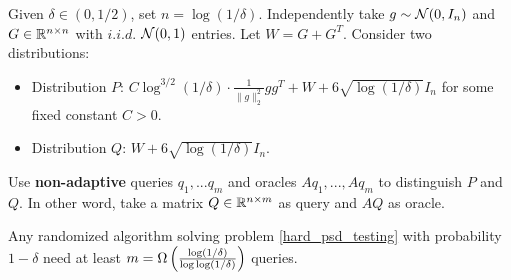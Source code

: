 \begin{prob}
    \label{hard_psd_testing}
    Given $\delta\in(0,1/2)$, set $n=\log(1/\delta)$. Independently take $g\sim\mathcal{N}(0,I_n)$ and $G\in\mathbb{R}^{n\times n}$ with $i.i.d.$ $\mathcal{N}(0,1)$ entries. Let $W=G+G^T$. Consider two distributions:
    \begin{itemize}
        \item Distribution $P$: $C\log^{3/2}(1/\delta)\cdot\frac{1}{\|g\|_2^2}gg^T + W + 6\sqrt{\log(1/\delta)}I_n$ for some fixed constant $C>0$.
        \item Distribution $Q$: $W + 6\sqrt{\log(1/\delta)}I_n$.
    \end{itemize}
    Use \textbf{non-adaptive} queries $q_1,...q_m$ and oracles $Aq_1,...,Aq_m$ to distinguish $P$ and $Q$. In other word, take a matrix $Q\in\mathbb{R}^{n\times m}$ as query and $AQ$ as oracle.
\end{prob}
\begin{thm}
    \label{hard_psd_testing_bound}
    Any randomized algorithm solving problem \ref{hard_psd_testing} with probability $1-\delta$ need at least $m=\Omega\left(\frac{\log(1/\delta)}{\log\log(1/\delta)}\right)$ queries. 
\end{thm}
